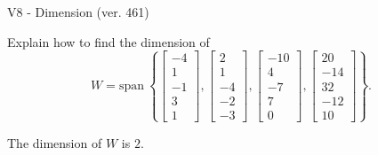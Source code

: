 \begin{exercise}
  \begin{exerciseTitle}V8 - Dimension (ver. 461)\end{exerciseTitle}
  \begin{exerciseStatement}
    Explain how to find the dimension of 
\[W=\mathrm{span}\ \left\{\left[\begin{array}{r}
-4 \\
1 \\
-1 \\
3 \\
1
\end{array}\right] , \left[\begin{array}{r}
2 \\
1 \\
-4 \\
-2 \\
-3
\end{array}\right] , \left[\begin{array}{r}
-10 \\
4 \\
-7 \\
7 \\
0
\end{array}\right] , \left[\begin{array}{r}
20 \\
-14 \\
32 \\
-12 \\
10
\end{array}\right]\right\}.\]



  \end{exerciseStatement}
  \begin{exerciseAnswer}
   The dimension of \(W\) is  \(2\).
  


  \end{exerciseAnswer}
\end{exercise}